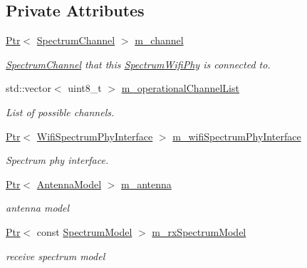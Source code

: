 \subsection*{Private Attributes}
\begin{DoxyCompactItemize}
\item 
\hyperlink{classns3_1_1Ptr}{Ptr}$<$ \hyperlink{classns3_1_1SpectrumChannel}{Spectrum\+Channel} $>$ \hyperlink{classns3_1_1SpectrumWifiPhy_a43a85d339058e0e48a1932cbf60650b0}{m\+\_\+channel}
\begin{DoxyCompactList}\small\item\em \hyperlink{classns3_1_1SpectrumChannel}{Spectrum\+Channel} that this \hyperlink{classns3_1_1SpectrumWifiPhy}{Spectrum\+Wifi\+Phy} is connected to. \end{DoxyCompactList}\item 
std\+::vector$<$ uint8\+\_\+t $>$ \hyperlink{classns3_1_1SpectrumWifiPhy_a8658f020e635d4d689bb99d1e71e81c1}{m\+\_\+operational\+Channel\+List}
\begin{DoxyCompactList}\small\item\em List of possible channels. \end{DoxyCompactList}\item 
\hyperlink{classns3_1_1Ptr}{Ptr}$<$ \hyperlink{classns3_1_1WifiSpectrumPhyInterface}{Wifi\+Spectrum\+Phy\+Interface} $>$ \hyperlink{classns3_1_1SpectrumWifiPhy_a8d4073a351a848f0a58bf05e83970564}{m\+\_\+wifi\+Spectrum\+Phy\+Interface}
\begin{DoxyCompactList}\small\item\em Spectrum phy interface. \end{DoxyCompactList}\item 
\hyperlink{classns3_1_1Ptr}{Ptr}$<$ \hyperlink{classns3_1_1AntennaModel}{Antenna\+Model} $>$ \hyperlink{classns3_1_1SpectrumWifiPhy_a54db14b60533b3c2d82f1b001eb17d6c}{m\+\_\+antenna}
\begin{DoxyCompactList}\small\item\em antenna model \end{DoxyCompactList}\item 
\hyperlink{classns3_1_1Ptr}{Ptr}$<$ const \hyperlink{classns3_1_1SpectrumModel}{Spectrum\+Model} $>$ \hyperlink{classns3_1_1SpectrumWifiPhy_ad3fd35b0100f628c126092dde86a939c}{m\+\_\+rx\+Spectrum\+Model}
\begin{DoxyCompactList}\small\item\em receive spectrum model \end{DoxyCompactList}\item 

\end{DoxyCompactItemize}

